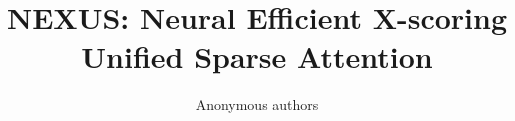 \title{\textbf{NEXUS: Neural Efficient X-scoring Unified Sparse Attention}}

\author{Anonymous authors}
